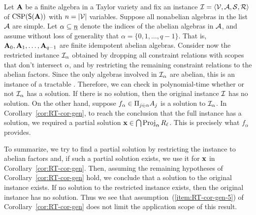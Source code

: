 Let $\mathbf{A}$ be a finite algebra in a Taylor variety 
and fix an instance $\mathcal{I} = \langle\mathcal{V}, \mathcal{A}, \mathcal{S}, \mathcal{R}\rangle$ of $\operatorname{CSP}(\mathsf{S}(\mathbf{A}))$
with $n = |\mathcal{V}|$ variables.
Suppose all nonabelian algebras in the list $\mathcal{A}$ are simple.
Let $\alpha \subseteq \underline{n}$ denote the indices of the abelian algebras in $\mathcal{A}$,
and assume without loss of generality that $\alpha = \{0,1,\dots, q-1\}$.
That is, $\mathbf{A}_0, \mathbf{A}_1, \dots, \mathbf{A}_{q-1}$ are finite idempotent abelian algebras. Consider
now the restricted instance $\mathcal{I}_\alpha$ obtained by dropping all constraint relations
with scopes that don't intersect $\alpha$, and by restricting the remaining constraint
relations to the abelian factors.
Since the only algebras involved in $\mathcal{I}_\alpha$ are abelian, this is an instance of a
tractable \csp.  Therefore, we can check in polynomial-time whether or not $\mathcal{I}_\alpha$
has a solution.
If there is no solution, then the original instance $\mathcal{I}$ has no solution.
On the other hand, suppose
$f_\alpha\in \Pi_{j\in \alpha}A_j$ is a solution to $\mathcal{I}_\alpha$.
In Corollary~\ref{cor:RT-cor-gen},
to reach the conclusion that the full instance has a solution, we 
required a partial solution $\mathbf{x} \in \bigcap \operatorname{Proj}_\alpha R_\ell$.
This is precisely what $f_\alpha$ provides.

To summarize, we try to find a partial 
solution by restricting the instance to abelian factors and, if such a partial solution exists,
we use it for $\mathbf{x}$ in Corollary~\ref{cor:RT-cor-gen}.
Then, assuming the remaining hypotheses of Corollary~\ref{cor:RT-cor-gen} hold,
we conclude that a solution to the original instance exists.
If no solution to the restricted instance exists, then the original instance has no solution.
Thus we see that assumption~(\ref{item:RT-cor-gen-5}) of
Corollary~\ref{cor:RT-cor-gen} does not limit the application scope of this result.

